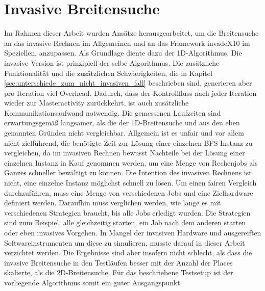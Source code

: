 \section{Invasive Breitensuche} %
\label{sec:invasive_breitensuche}
Im Rahmen dieser Arbeit wurden Ansätze herausgearbeitet, um die Breitensuche an das invasive Rechnen im Allgemeinen und an das Framework invadeX10 im Speziellen, anzupassen. Als Grundlage diente dazu der 1D-Algorithmus. Die invasive Version ist prinzipiell der selbe Algorithmus. Die zusätzliche Funktionalität und die zusätzlichen Schwierigkeiten, die in Kapitel \ref{sec:unterschiede_zum_nicht_invasiven_fall} beschrieben sind, generieren aber pro Iteration viel Overhead. Dadurch, dass der Kontrollfluss nach jeder Iteration wieder zur Masteractivity zurückkehrt, ist auch zusätzliche Kommunikationsaufwand notwendig. Die gemessenen Laufzeiten sind erwartungsgemäß  langsamer, als die der 1D-Breitensuche und aus den eben genannten Gründen nicht vergleichbar. Allgemein ist es unfair und vor allem nicht zielführend, die benötigte Zeit zur Lösung einer einzelnen BFS-Instanz zu vergleichen, da im invasiven Rechnen bewusst Nachteile bei der Lösung einer einzelnen Instanz in Kauf genommen werden, um eine Menge von Rechenjobs als Ganzes schneller bewältigt zu können. Die Intention des invasiven Rechnens ist nicht, eine einzelne Instanz möglichst schnell zu lösen. Um einen fairen Vergleich durchzuführen, muss eine Menge von verschiedenen Jobs und eine Zielhardware definiert werden. Daraufhin muss verglichen werden, wie lange es mit verschiedenen Strategien braucht, bis alle Jobs erledigt wurden. Die Strategien sind zum Beispiel, alle gleichzeitig starten, ein Job nach dem anderen starten oder eben invasives Vorgehen. In Mangel der invasiven Hardware und ausgereiften Softwareinstrumenten um diese zu simulieren, musste darauf in dieser Arbeit verzichtet werden. Die Ergebnisse sind aber insofern nicht schlecht, als dass die invasive Breitensuche in den Testläufen besser mit der Anzahl der Places skalierte, als die 2D-Breitensuche.  Für das beschriebene Testsetup ist der vorliegende Algorithmus somit ein guter Ausgangspunkt.


